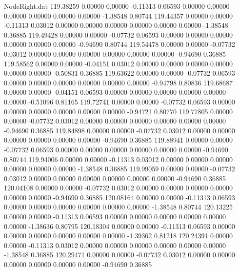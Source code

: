 \begin{filecontents}{NodeRight.dat}
 119.38259    0.00000    0.00000    -0.11313    0.06593    0.00000    0.00000    0.00000    0.00000    0.00000    0.00000   -1.38548    0.80744
 119.44357    0.00000    0.00000    -0.11313    0.03012    0.00000    0.00000    0.00000    0.00000    0.00000    0.00000   -1.38548    0.36885
 119.49428    0.00000    0.00000    -0.07732    0.06593    0.00000    0.00000    0.00000    0.00000    0.00000    0.00000   -0.94690    0.80744
 119.54478    0.00000    0.00000    -0.07732    0.03012    0.00000    0.00000    0.00000    0.00000    0.00000    0.00000   -0.94690    0.36885
 119.58562    0.00000    0.00000    -0.04151    0.03012    0.00000    0.00000    0.00000    0.00000    0.00000    0.00000   -0.50831    0.36885
 119.63622    0.00000    0.00000    -0.07732    0.06593    0.00000    0.00000    0.00000    0.00000    0.00000    0.00000   -0.94798    0.80836
 119.68687    0.00000    0.00000    -0.04151    0.06593    0.00000    0.00000    0.00000    0.00000    0.00000    0.00000   -0.51096    0.81165
 119.72741    0.00000    0.00000    -0.07732    0.06593    0.00000    0.00000    0.00000    0.00000    0.00000    0.00000   -0.94721    0.80770
 119.77805    0.00000    0.00000    -0.07732    0.03012    0.00000    0.00000    0.00000    0.00000    0.00000    0.00000   -0.94690    0.36885
 119.84898    0.00000    0.00000    -0.07732    0.03012    0.00000    0.00000    0.00000    0.00000    0.00000    0.00000   -0.94690    0.36885
 119.88941    0.00000    0.00000    -0.07732    0.06593    0.00000    0.00000    0.00000    0.00000    0.00000    0.00000   -0.94690    0.80744
 119.94006    0.00000    0.00000    -0.11313    0.03012    0.00000    0.00000    0.00000    0.00000    0.00000    0.00000   -1.38548    0.36885
 119.99059    0.00000    0.00000    -0.07732    0.03012    0.00000    0.00000    0.00000    0.00000    0.00000    0.00000   -0.94690    0.36885
 120.04108    0.00000    0.00000    -0.07732    0.03012    0.00000    0.00000    0.00000    0.00000    0.00000    0.00000   -0.94690    0.36885
 120.08164    0.00000    0.00000    -0.11313    0.06593    0.00000    0.00000    0.00000    0.00000    0.00000    0.00000   -1.38548    0.80744
 120.13225    0.00000    0.00000    -0.11313    0.06593    0.00000    0.00000    0.00000    0.00000    0.00000    0.00000   -1.38636    0.80795
 120.18304    0.00000    0.00000    -0.11313    0.06593    0.00000    0.00000    0.00000    0.00000    0.00000    0.00000   -1.39362    0.81218
 120.24391    0.00000    0.00000    -0.11313    0.03012    0.00000    0.00000    0.00000    0.00000    0.00000    0.00000   -1.38548    0.36885
 120.29471    0.00000    0.00000    -0.07732    0.03012    0.00000    0.00000    0.00000    0.00000    0.00000    0.00000   -0.94690    0.36885

\end{filecontents}
